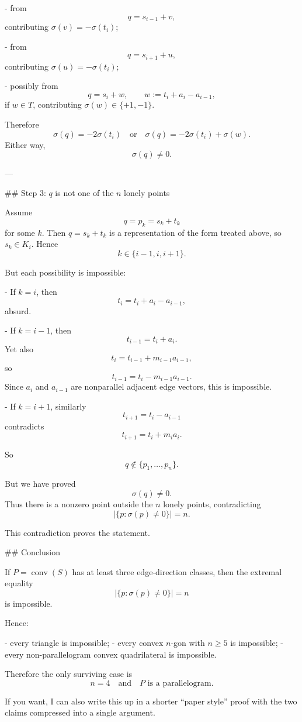 - from
  \[
  q=s_{i-1}+v,
  \]
  contributing \(\sigma(v)=-\sigma(t_i)\);

- from
  \[
  q=s_{i+1}+u,
  \]
  contributing \(\sigma(u)=-\sigma(t_i)\);

- possibly from
  \[
  q=s_i+w,
  \qquad
  w:=t_i+a_i-a_{i-1},
  \]
  if \(w\in T\), contributing \(\sigma(w)\in\{+1,-1\}\).

Therefore
\[
\sigma(q)= -2\sigma(t_i)
\quad\text{or}\quad
\sigma(q)= -2\sigma(t_i)+\sigma(w).
\]
Either way,
\[
\sigma(q)\neq 0.
\]

---

## Step \(3\): \(q\) is not one of the \(n\) lonely points

Assume
\[
q=p_k=s_k+t_k
\]
for some \(k\). Then \(q=s_k+t_k\) is a representation of the form treated above, so \(s_k\in K_i\). Hence
\[
k\in\{i-1,i,i+1\}.
\]

But each possibility is impossible:

- If \(k=i\), then
  \[
  t_i=t_i+a_i-a_{i-1},
  \]
  absurd.

- If \(k=i-1\), then
  \[
  t_{i-1}=t_i+a_i.
  \]
  Yet also
  \[
  t_i=t_{i-1}+m_{i-1}a_{i-1},
  \]
  so
  \[
  t_{i-1}=t_i-m_{i-1}a_{i-1}.
  \]
  Since \(a_i\) and \(a_{i-1}\) are nonparallel adjacent edge vectors, this is impossible.

- If \(k=i+1\), similarly
  \[
  t_{i+1}=t_i-a_{i-1}
  \]
  contradicts
  \[
  t_{i+1}=t_i+m_i a_i.
  \]

So
\[
q\notin\{p_1,\dots,p_n\}.
\]

But we have proved
\[
\sigma(q)\neq 0.
\]
Thus there is a nonzero point outside the \(n\) lonely points, contradicting
\[
\bigl|\{p:\sigma(p)\neq 0\}\bigr|=n.
\]

This contradiction proves the statement.

## Conclusion

If \(P=\operatorname{conv}(S)\) has at least three edge-direction classes, then the extremal equality
\[
\bigl|\{p:\sigma(p)\neq 0\}\bigr|=n
\]
is impossible.

Hence:

- every triangle is impossible;
- every convex \(n\)-gon with \(n\ge 5\) is impossible;
- every non-parallelogram convex quadrilateral is impossible.

Therefore the only surviving case is
\[
n=4
\quad\text{and}\quad
P\text{ is a parallelogram.}
\]

If you want, I can also write this up in a shorter “paper style” proof with the two claims compressed into a single argument.